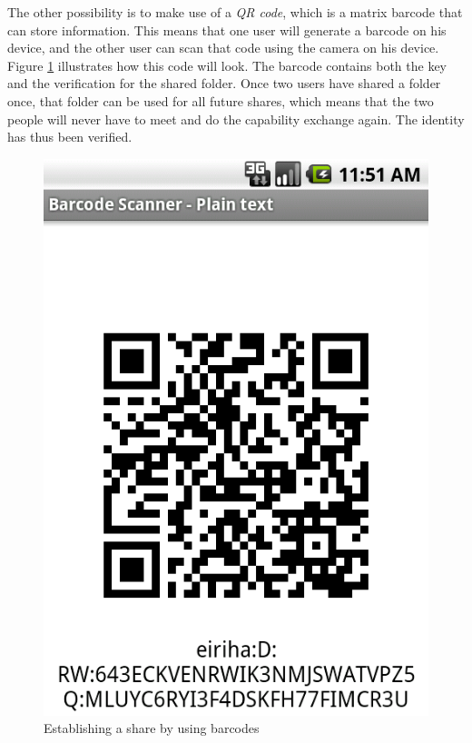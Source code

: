 \documentclass[pdftex,english,10pt,b5paper,twoside]{book}
\begin{document}
The other possibility is to make use of a \emph{\ac{QR} code}, which is a
matrix barcode that can store information. This means that one user will
generate a barcode on his device, and the other user can scan that code using
the camera on his device. Figure \ref{fig:CSVAndroid:barcode} illustrates how
this code will look. The barcode contains both the key and the verification for
the shared folder. Once two users have shared a folder once, that folder can be
used for all future shares, which means that the two people will never have to
meet and do the capability exchange again. The identity has thus been verified.

\begin{figure}[h!]
    \centering
    \includegraphics[scale=0.4]{client-barcode.png}
    \caption{Establishing a share by using barcodes}
    \label{fig:CSVAndroid:barcode}
\end{figure}
\end{document}
